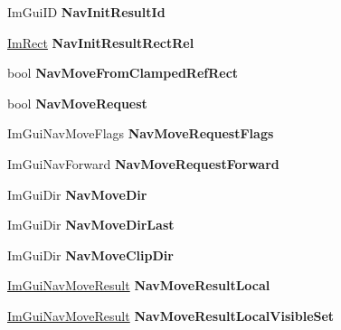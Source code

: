 \begin{DoxyCompactItemize}
Im\+Gui\+ID {\bfseries Nav\+Init\+Result\+Id}
\item 
\mbox{\label{structImGuiContext_a4d59fe60fd93303628212a3d52f6c9e0}} 
\hyperlink{structImRect}{Im\+Rect} {\bfseries Nav\+Init\+Result\+Rect\+Rel}
\item 
\mbox{\label{structImGuiContext_a5571249e733688870409369db98fde79}} 
bool {\bfseries Nav\+Move\+From\+Clamped\+Ref\+Rect}
\item 
\mbox{\label{structImGuiContext_ab476c1e9c5fca5e45ca80001a5fd532e}} 
bool {\bfseries Nav\+Move\+Request}
\item 
\mbox{\label{structImGuiContext_a04545cc7ba343f69391ea61b8dc62df2}} 
Im\+Gui\+Nav\+Move\+Flags {\bfseries Nav\+Move\+Request\+Flags}
\item 
\mbox{\label{structImGuiContext_a96fd534ce6bec43e3b23cb71cda1b62c}} 
Im\+Gui\+Nav\+Forward {\bfseries Nav\+Move\+Request\+Forward}
\item 
\mbox{\label{structImGuiContext_a20208736529ff4a1067d8d15ef17400b}} 
Im\+Gui\+Dir {\bfseries Nav\+Move\+Dir}
\item 
\mbox{\label{structImGuiContext_a74b9822c7771e7c331d72e0862910243}} 
Im\+Gui\+Dir {\bfseries Nav\+Move\+Dir\+Last}
\item 
\mbox{\label{structImGuiContext_a445c588479dbf5122c062ba8bcdb99e2}} 
Im\+Gui\+Dir {\bfseries Nav\+Move\+Clip\+Dir}
\item 
\mbox{\label{structImGuiContext_ad7d98d5f91fbbe9b0dacee866832ea6d}} 
\hyperlink{structImGuiNavMoveResult}{Im\+Gui\+Nav\+Move\+Result} {\bfseries Nav\+Move\+Result\+Local}
\item 
\mbox{\label{structImGuiContext_a234e82aaa932f5cc000b274453b74942}} 
\hyperlink{structImGuiNavMoveResult}{Im\+Gui\+Nav\+Move\+Result} {\bfseries Nav\+Move\+Result\+Local\+Visible\+Set}
\item 
\mbox{\label{structImGuiContext_a850becf9154be7f47580cfebc9f80127}} 

\end{DoxyCompactItemize}

